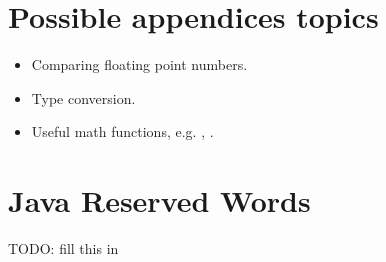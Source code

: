 \section*{Possible appendices topics}

\begin{itemize}

	\item Comparing floating point numbers.
	\item Type conversion.
	\item Useful math functions, e.g. , .

\end{itemize}

\section{Java Reserved Words}

TODO: fill this in